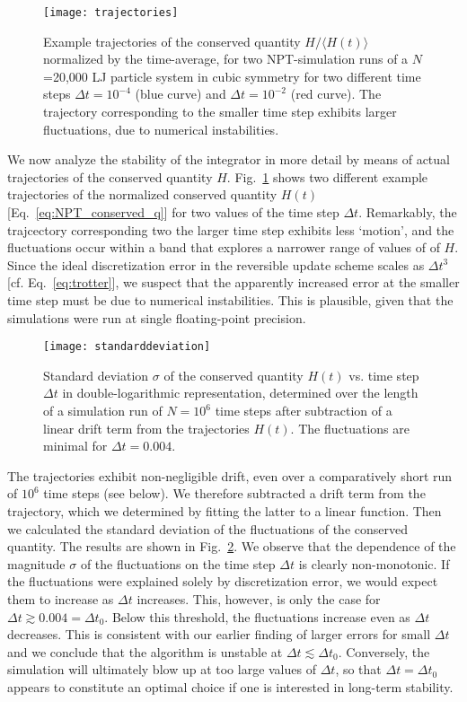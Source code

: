 \documentclass[12pt,letter]{article}
\begin{document}
\begin{figure}
\centering\texttt{[image: trajectories]}
\caption{Example trajectories of the conserved quantity $H/\langle
  H(t)\rangle$ normalized by the time-average, for two NPT-simulation
  runs of a $N$=20,000 LJ particle system in cubic symmetry for two
  different time steps $\Delta t = 10^{-4}$ (blue curve) and $\Delta t=
  10^{-2}$ (red curve).  The trajectory corresponding to the smaller
  time step exhibits larger fluctuations, due to numerical
  instabilities.}
\label{fig:trajectories}
\end{figure}


We now analyze the stability of the integrator in more detail by means
of actual trajectories of the conserved quantity
$H$. Fig.~\ref{fig:trajectories} shows two different example
trajectories of the normalized conserved quantity $H(t)$
[Eq.~\eqref{eq:NPT_conserved_q}] for two values of the time step
$\Delta t$. Remarkably, the trajcectory corresponding two the larger
time step exhibits less `motion', and the fluctuations occur within a
band that explores a narrower range of values of of $H$. Since the
ideal discretization error in the reversible update scheme scales as
$\Delta t^3$ [cf. Eq.~\eqref{eq:trotter}], we suspect that the
apparently increased error at the smaller time step must be due to
numerical instabilities. This is plausible, given that the simulations
were run at single floating-point precision.

\begin{figure}
\centering\texttt{[image: standarddeviation]}
\caption{Standard deviation $\sigma$ of the conserved quantity $H(t)$
  vs. time step $\Delta t$ in double-logarithmic representation,
  determined over the length of a simulation run of $N=10^6$ time
  steps after subtraction of a linear drift term from the trajectories
  $H(t)$. The fluctuations are minimal for $\Delta t=0.004$.}
\label{fig:standarddeviation}
\end{figure}

The trajectories exhibit non-negligible drift, even over a comparatively
short run of $10^6$ time steps (see below). We therefore subtracted a drift term
from the trajectory, which we determined by fitting the latter to a
linear function. Then we calculated the standard deviation of the
fluctuations of the conserved quantity.  The results are shown in
Fig.~\ref{fig:standarddeviation}. We observe that the dependence of
the magnitude $\sigma$ of the fluctuations on the time step $\Delta t$
is clearly non-monotonic. If the fluctuations were explained solely by
discretization error, we would expect them to increase as $\Delta t$
increases.  This, however, is only the case for $\Delta t \gtrsim
0.004 = \Delta t_0$. Below this threshold, the fluctuations increase
even as $\Delta t$ decreases.  This is consistent with our earlier
finding of larger errors for small $\Delta t$ and we conclude that the
algorithm is unstable at $\Delta t \lesssim \Delta
t_0$. Conversely, the simulation will ultimately blow up at too large
values of $\Delta t$, so that $\Delta t=\Delta t_0$ appears to
constitute an optimal choice if one is interested in long-term
stability.
\end{document}
